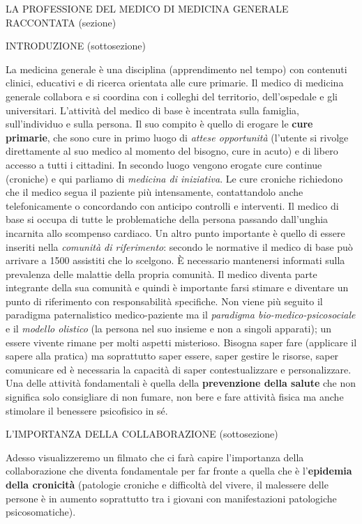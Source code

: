 \documentclass[]{article}
\date{}
\begin{document}
LA PROFESSIONE DEL MEDICO DI MEDICINA GENERALE RACCONTATA (sezione)

INTRODUZIONE (sottosezione)

La medicina generale è una disciplina (apprendimento nel tempo) con
contenuti clinici, educativi e di ricerca orientata alle cure primarie.
Il medico di medicina generale collabora e si coordina con i colleghi
del territorio, dell'ospedale e gli universitari. L'attività del medico
di base è incentrata sulla famiglia, sull'individuo e sulla persona. Il
suo compito è quello di erogare le \textbf{cure primarie}, che sono cure
in primo luogo di \emph{attese opportunità} (l'utente si rivolge
direttamente al suo medico al momento del bisogno, cure in acuto) e di
libero accesso a tutti i cittadini. In secondo luogo vengono erogate
cure continue (croniche) e qui parliamo di \emph{medicina di
iniziativa}. Le cure croniche richiedono che il medico segua il paziente
più intensamente, contattandolo anche telefonicamente o concordando con
anticipo controlli e interventi. Il medico di base si occupa di tutte le
problematiche della persona passando dall'unghia incarnita allo
scompenso cardiaco. Un altro punto importante è quello di essere
inseriti nella \emph{comunità di riferimento}: secondo le normative il
medico di base può arrivare a 1500 assistiti che lo scelgono. È
necessario mantenersi informati sulla prevalenza delle malattie della
propria comunità. Il medico diventa parte integrante della sua comunità
e quindi è importante farsi stimare e diventare un punto di riferimento
con responsabilità specifiche. Non viene più seguito il paradigma
paternalistico medico-paziente ma il \emph{paradigma
bio-medico-psicosociale} e il \emph{modello olistico} (la persona nel
suo insieme e non a singoli apparati); un essere vivente rimane per
molti aspetti misterioso. Bisogna saper fare (applicare il sapere alla
pratica) ma soprattutto saper essere, saper gestire le risorse, saper
comunicare ed è necessaria la capacità di saper contestualizzare e
personalizzare. Una delle attività fondamentali è quella della
\textbf{prevenzione della salute} che non significa solo consigliare di
non fumare, non bere e fare attività fisica ma anche stimolare il
benessere psicofisico in sé.

L'IMPORTANZA DELLA COLLABORAZIONE (sottosezione)

Adesso visualizzeremo un filmato che ci farà capire l'importanza della
collaborazione che diventa fondamentale per far fronte a quella che è
l'\textbf{epidemia della cronicità} (patologie croniche e difficoltà del
vivere, il malessere delle persone è in aumento soprattutto tra i
giovani con manifestazioni patologiche psicosomatiche).
\end{document}
